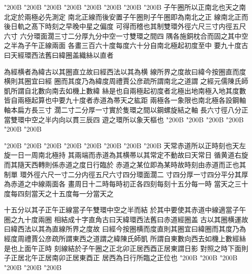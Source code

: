 \begin{正文}
\char"200B\relax{}
\char"200B\relax{}
\char"200B\relax{}
\char"200B\relax{}
\char"200B\relax{}
\char"200B\relax{}
\char"200B\relax{}
\char"200B\relax{}
子午圈所以正南北也天之南北定於兩極必先測定
南北正線而後安置子午圈則子午圈即為南北之正
線南北正而後日軌之髙下時刻之早晚中星之偏度
可得而稽也其制雙環外徑六尺三寸内徑五尺六寸
六分環面濶三寸二分厚九分中空一寸雙環之間四
隅各施銅枕合而固之其中空之半為子午正線兩面
各畫三百六十度每度六十分自南北極起初度至中
要九十度古曰天經環西法舊曰緯圈盖織絲以直者
\par
為經横者為緯古以其圈直立故曰經西法以其為横
線所界之度故曰緯今按圈直而度横則其圈宜曰經
圈而其度乃為緯度周禮賈公彦疏所謂南北之道謂
之經元儒陳氏師凱所謂自北數向南去如機上數緯
絲是也自兩極起初度者北極出地南極入地其度數
皆自兩極起算也中要九十度者赤道為帯天之紘距
兩極各一象限也南北極各設鋼軸軸本扁方長三寸
濶二寸二分厚一寸實於隻環之間以鋼螺旋結之軸
長六寸徑八分正當雙環中空之半内向以貫三辰四
遊之環所以象天樞也
\char"200B\relax{}
\char"200B\relax{}
\char"200B\relax{}
\char"200B\relax{}
\char"200B\relax{}
\char"200B\relax
\par
\end{正文}\clearpage
{}
\begin{正文}
\char"200B\relax{}
\char"200B\relax{}
\char"200B\relax{}
\char"200B\relax{}
\char"200B\relax{}
\char"200B\relax{}
\char"200B\relax{}
\char"200B\relax{}
天常赤道所以正時刻也天左旋一日一周南北極持
其兩端而赤道為其横帯以其常定不動故曰天常日
循黄道右旋而其隨天西轉則係赤道之度日行臨於
赤道之某位即為某時故時刻由赤道而正也其制單
環外徑六尺一寸二分内徑五尺六寸四分環面濶二
寸四分厚一寸四分平分其厚為赤道之中線兩面各
畫周日十二時每時初正各四刻每刻十五分每一時
當天之三十度每四刻當天之十五度每一分當天之
\par
十五分以其子正午正線當子午雙環中空之半而結
於其中要使其赤道中線適當子午圏之九十度兩圈
相結成十字直角古曰天緯環西法舊曰赤道經圈盖
古以其圈横運故曰緯西法以其為直線所界之度故
曰經今按圈横而度直則其圈宜曰緯圈而其度乃為
經度周禮賈公彦疏所謂東西之道謂之緯陳氏師凱
所謂自東數向西去如機上數經絲是也上面午正時
刻線結於子午圈之正北卯正居西酉正居東謂日影
對照之時下面則子正居北午正居南卯正居東酉正
居西為日行所臨之正位也
\char"200B\relax{}
\char"200B\relax{}
\char"200B\relax{}
\char"200B\relax{}
\char"200B\relax{}
\char"200B\relax
\par
\end{正文}\clearpage
